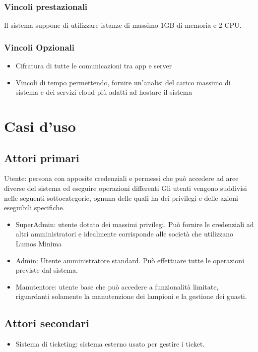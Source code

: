 \documentclass[12pt]{article}
\begin{document}
\subsubsection{Vincoli prestazionali}
Il sistema suppone di utilizzare istanze di massimo 1GB di memoria e 2 CPU.

\subsubsection{Vincoli Opzionali}
\begin{itemize}
	\item Cifratura di tutte le comunicazioni tra app e server
	\item Vincoli di tempo permettendo, fornire un'analisi del carico massimo di sistema e dei servizi cloud più adatti ad hostare il sistema
\end{itemize}


\section{Casi d'uso}

\subsection{Attori primari}
Utente: persona con apposite credenziali e permessi che può accedere ad aree diverse del sistema ed eseguire operazioni differenti
Gli utenti vengono suddivisi nelle seguenti sottocategorie, ognuna delle quali ha dei privilegi e delle azioni eseguibili specifiche.
\begin{itemize}
	\item SuperAdmin: utente dotato dei massimi privilegi. Può fornire le credenziali ad altri amministratori e idealmente corrisponde alle società che utilizzano Lumos Minima
	\item Admin: Utente amministratore standard. Può effettuare tutte le operazioni previste dal sistema.
	\item Manutentore: utente base che può accedere a funzionalità limitate, riguardanti solamente la manutenzione dei lampioni e la gestione dei guasti.
\end{itemize}

\subsection{Attori secondari}
\begin{itemize}
	\item Sistema di ticketing: sistema esterno usato per gestire i ticket.
\end{itemize}
\end{document}
